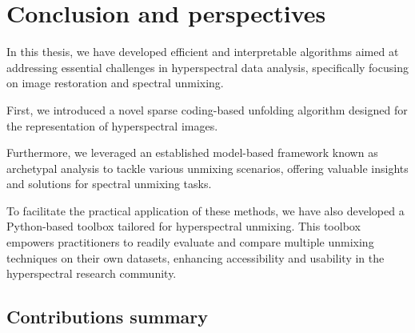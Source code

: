 

\chapter{Conclusion and perspectives}
\label{ch:ccl}

\chead[\fancyplain{}{}]
      {\fancyplain{}{}}
\lfoot[\fancyplain{}{}]
      {\fancyplain{}{}}
\cfoot[\fancyplain{}{\thepage}]
      {\fancyplain{}{\thepage}}
\rfoot[\fancyplain{}{}]
     {\fancyplain{}{\scriptsize}}


In this thesis, we have developed efficient and interpretable algorithms aimed at addressing essential challenges in hyperspectral data analysis, specifically focusing on image restoration and spectral unmixing.

First, we introduced a novel sparse coding-based unfolding algorithm designed for the representation of hyperspectral images.

Furthermore, we leveraged an established model-based framework known as archetypal analysis to tackle various unmixing scenarios, offering valuable insights and solutions for spectral unmixing tasks.

To facilitate the practical application of these methods, we have also developed a Python-based toolbox tailored for hyperspectral unmixing.
This toolbox empowers practitioners to readily evaluate and compare multiple unmixing techniques on their own datasets, enhancing accessibility and usability in the hyperspectral research community.

\section{Contributions summary}

